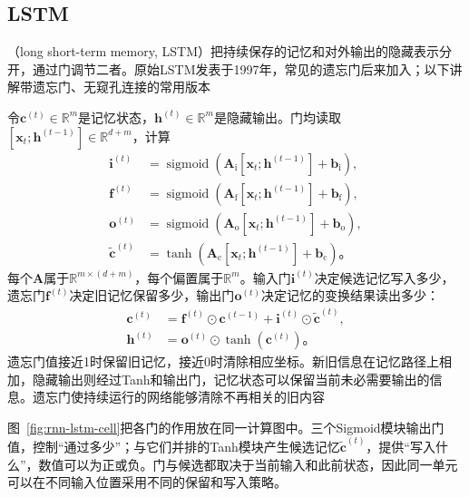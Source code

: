 \subsection{LSTM}
\label{sec:rnn-lstm}

（long short-term memory, LSTM）把持续保存的记忆和对外输出的隐藏表示分开，通过门调节二者。原始LSTM发表于1997年，常见的遗忘门后来加入；以下讲解带遗忘门、无窥孔连接的常用版本

令$\bm{c}^{(t)}\in\mathbb{R}^{m}$是记忆状态，$\bm{h}^{(t)}\in\mathbb{R}^{m}$是隐藏输出。门均读取$[\bm{x}_t;\bm{h}^{(t-1)}]\in\mathbb{R}^{d+m}$，计算
\begin{equation}
  \begin{aligned}
    \bm{i}^{(t)}&=\operatorname{sigmoid}\!\left(
      \bm{A}_{\mathrm{i}}[\bm{x}_t;\bm{h}^{(t-1)}]+\bm{b}_{\mathrm{i}}\right),\\
    \bm{f}^{(t)}&=\operatorname{sigmoid}\!\left(
      \bm{A}_{\mathrm{f}}[\bm{x}_t;\bm{h}^{(t-1)}]+\bm{b}_{\mathrm{f}}\right),\\
    \bm{o}^{(t)}&=\operatorname{sigmoid}\!\left(
      \bm{A}_{\mathrm{o}}[\bm{x}_t;\bm{h}^{(t-1)}]+\bm{b}_{\mathrm{o}}\right),\\
    \widetilde{\bm{c}}^{(t)}&=\tanh\!\left(
      \bm{A}_{\mathrm{c}}[\bm{x}_t;\bm{h}^{(t-1)}]+\bm{b}_{\mathrm{c}}\right)\text{。}
  \end{aligned}
  \label{eq:rnn-lstm-gates}
\end{equation}
每个$\bm{A}$属于$\mathbb{R}^{m\times(d+m)}$，每个偏置属于$\mathbb{R}^{m}$。输入门$\bm{i}^{(t)}$决定候选记忆写入多少，遗忘门$\bm{f}^{(t)}$决定旧记忆保留多少，输出门$\bm{o}^{(t)}$决定记忆的变换结果读出多少：
\begin{equation}
  \begin{aligned}
    \bm{c}^{(t)}&=\bm{f}^{(t)}\odot\bm{c}^{(t-1)}
       +\bm{i}^{(t)}\odot\widetilde{\bm{c}}^{(t)},\\
    \bm{h}^{(t)}&=\bm{o}^{(t)}\odot\tanh\!\left(\bm{c}^{(t)}\right)\text{。}
  \end{aligned}
  \label{eq:rnn-lstm-update}
\end{equation}
遗忘门值接近1时保留旧记忆，接近0时清除相应坐标。新旧信息在记忆路径上相加，隐藏输出则经过Tanh和输出门，记忆状态可以保留当前未必需要输出的信息。遗忘门使持续运行的网络能够清除不再相关的旧内容

图~\ref{fig:rnn-lstm-cell}把各门的作用放在同一计算图中。三个Sigmoid模块输出门值，控制“通过多少”；与它们并排的Tanh模块产生候选记忆$\widetilde{\bm c}^{(t)}$，提供“写入什么”，数值可以为正或负。门与候选都取决于当前输入和此前状态，因此同一单元可以在不同输入位置采用不同的保留和写入策略。

